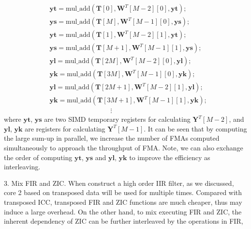 \begin{equation}
    \label{eq:parallelized_sum_up}
    \begin{aligned}
        & \bm{yt} = \text{mul\_add}(\bm{T}[0],\bm{W}^T[M{-}2][0],\bm{yt}); \\
        & \bm{ys} = \text{mul\_add}(\bm{T}[M],\bm{W}^T[M{-}1][0],\bm{ys}); \\
        & \bm{yt} = \text{mul\_add}(\bm{T}[1],\bm{W}^T[M{-}2][1],\bm{yt}); \\
        & \bm{ys} = \text{mul\_add}(\bm{T}[M{+}1],\bm{W}^T[M{-}1][1],\bm{ys}); \\
        & \bm{yl} = \text{mul\_add}(\bm{T}[2M],\bm{W}^T[M{-}2][0],\bm{yl}); \\
        & \bm{yk} = \text{mul\_add}(\bm{T}[3M],\bm{W}^T[M{-}1][0],\bm{yk}); \\
        & \bm{yl} = \text{mul\_add}(\bm{T}[2M{+}1],\bm{W}^T[M{-}2][1],\bm{yl}); \\
        & \bm{yk} = \text{mul\_add}(\bm{T}[3M{+}1],\bm{W}^T[M{-}1][1],\bm{yk}); \\
        & \quad\quad\quad\quad\quad\quad\quad\quad\quad \vdots
    \end{aligned}
\end{equation}
where $\bm{yt}$, $\bm{ys}$ are two SIMD temporary registers for calculating $\bm{Y}^T[M{-}2]$, and
$\bm{yl}$, $\bm{yk}$ are registers for calculating $\bm{Y}^T[M{-}1]$. It can be seen that by computing the 
large sum-up in parallel, we increase the number of FMAs computed simultaneously to approach the throughput of FMA.
Note, we can also exchange the order of computing $\bm{yt}$, $\bm{ys}$ and $\bm{yl}$, $\bm{yk}$ 
to improve the efficiency as interleaving.

3. Mix FIR and ZIC. When construct a high order IIR filter, as we discussed, core 2 based on transposed data will be used 
for multiple times. Compared with transposed ICC, transposed FIR and ZIC functions are much cheaper, thus may induce a large overhead.
On the other hand, to mix executing FIR and ZIC, the inherent dependency of ZIC can be further interleaved by the operations in FIR,

